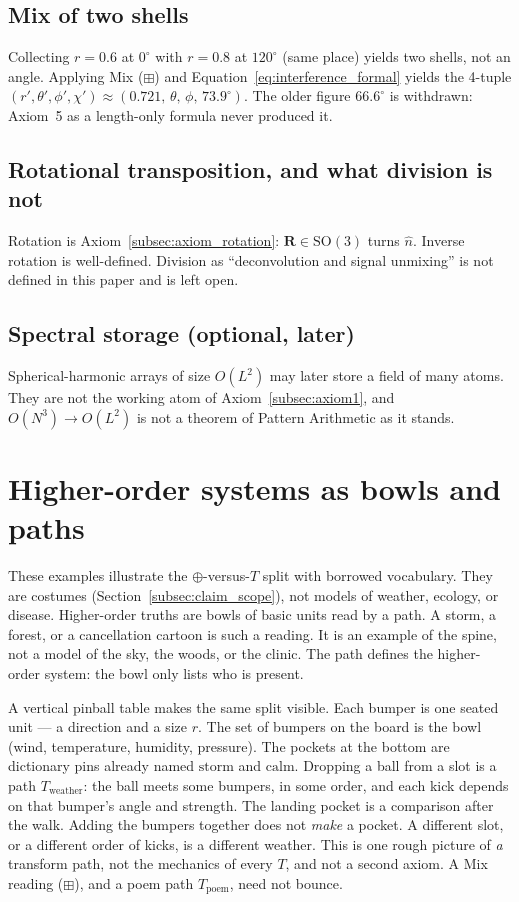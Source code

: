 \documentclass[12pt, a4paper]{article}
\begin{document}
\subsection{Mix of two shells}
Collecting $r=0.6$ at $0^\circ$ with $r=0.8$ at $120^\circ$ (same
place) yields two shells, not an angle. Applying Mix ($\boxplus$) and
Equation~\eqref{eq:interference_formal} yields the 4-tuple
$(r',\theta',\phi',\chi')\approx(0.721,\,\theta,\,\phi,\,73.9^\circ)$.
The older figure $66.6^\circ$ is withdrawn: Axiom~5 as a length-only
formula never produced it.

\subsection{Rotational transposition, and what division is not}
\label{subsec:division_open}
Rotation is Axiom~\ref{subsec:axiom_rotation}: $\mathbf{R}\in\mathrm{SO}(3)$
turns $\hat n$. Inverse rotation is well-defined. Division as
``deconvolution and signal unmixing'' is not defined in this paper and
is left open.

\subsection{Spectral storage (optional, later)}
Spherical-harmonic arrays of size $O(L^2)$ may later store a field of
many atoms. They are not the working atom of
Axiom~\ref{subsec:axiom1}, and $O(N^3)\to O(L^2)$ is not a theorem of
Pattern Arithmetic as it stands.

\section{Higher-order systems as bowls and paths}
\label{sec:higher_order}
These examples illustrate the $\oplus$-versus-$T$ split with borrowed
vocabulary. They are costumes
(Section~\ref{subsec:claim_scope}), not models of weather, ecology,
or disease.
Higher-order truths are bowls of basic units read by a path.
A storm, a forest, or a cancellation cartoon is such a reading.
It is an example of the spine, not a model of the sky, the woods,
or the clinic. The path defines the higher-order system: the bowl
only lists who is present.

A vertical pinball table makes the same split visible. Each bumper
is one seated unit --- a direction and a size \(r\). The set of
bumpers on the board is the bowl (wind, temperature, humidity,
pressure). The pockets at the bottom are dictionary pins already
named \(\mathrm{storm}\) and \(\mathrm{calm}\). Dropping a ball from
a slot is a path \(T_{\mathrm{weather}}\): the ball meets some
bumpers, in some order, and each kick depends on that bumper's
angle and strength. The landing pocket is a comparison after the
walk. Adding the bumpers together does not \emph{make} a pocket.
A different slot, or a different order of kicks, is a different
weather. This is one rough picture of \emph{a} transform path, not
the mechanics of every $T$, and not a second axiom. A Mix reading ($\boxplus$), and a poem path $T_{\mathrm{poem}}$, need not bounce.
\end{document}
